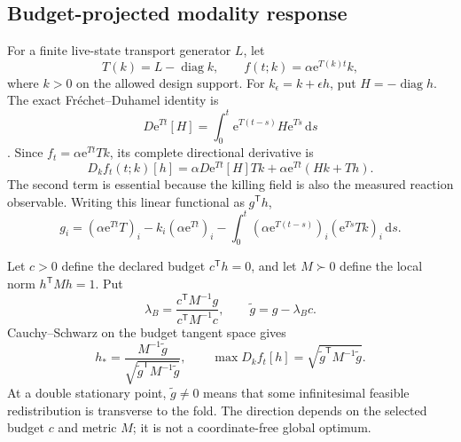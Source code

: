 \documentclass[aps,pre,reprint,amsmath,amssymb,longbibliography,floatfix]{revtex4-2}
\newcommand{\dd}{\mathrm d}
\newcommand{\e}{\mathrm e}
\begin{document}
\subsection{Budget-projected modality response}
\label{sec:budget-gradient}

For a finite live-state transport generator \(L\), let
\begin{equation}
T(k)=L-\operatorname{diag}k,\qquad
f(t;k)=\alpha\e^{T(k)t}k,
\label{eq:killing-design-model}
\end{equation}
where \(k>0\) on the allowed design support. For
\(k_\epsilon=k+\epsilon h\), put \(H=-\operatorname{diag}h\). The exact
Fr\'echet--Duhamel identity is
\begin{equation}
D\e^{Tt}[H]=\int_0^t\e^{T(t-s)}H\e^{Ts}\,\dd s
\label{eq:design-duhamel}
\end{equation}
\cite{alMohyHigham2009frechet}. Since
\(f_t=\alpha\e^{Tt}Tk\), its complete directional derivative is
\begin{equation}
D_kf_t(t;k)[h]
=\alpha D\e^{Tt}[H]Tk+\alpha\e^{Tt}(Hk+Th).
\label{eq:modality-susceptibility}
\end{equation}
The second term is essential because the killing field is also the measured
reaction observable. Writing this linear functional as \(g^\mathsf Th\),
\begin{equation}
g_i=(\alpha\e^{Tt}T)_i-k_i(\alpha\e^{Tt})_i
-\int_0^t(\alpha\e^{T(t-s)})_i(\e^{Ts}Tk)_i\,\dd s.
\label{eq:modality-gradient}
\end{equation}

Let \(c>0\) define the declared budget \(c^\mathsf Th=0\), and let
\(M\succ0\) define the local norm \(h^\mathsf TMh=1\). Put
\begin{equation}
\lambda_B=\frac{c^\mathsf TM^{-1}g}{c^\mathsf TM^{-1}c},
\qquad \widetilde g=g-\lambda_Bc.
\label{eq:budget-projection}
\end{equation}
Cauchy--Schwarz on the budget tangent space gives
\begin{equation}
h_*=\frac{M^{-1}\widetilde g}
{\sqrt{\widetilde g^\mathsf TM^{-1}\widetilde g}},
\qquad
\max D_kf_t[h]=\sqrt{\widetilde g^\mathsf TM^{-1}\widetilde g}.
\label{eq:optimal-redistribution}
\end{equation}
At a double stationary point, \(\widetilde g\ne0\) means that some
infinitesimal feasible redistribution is transverse to the fold. The
direction depends on the selected budget \(c\) and metric \(M\); it is not a
coordinate-free global optimum.
\end{document}
